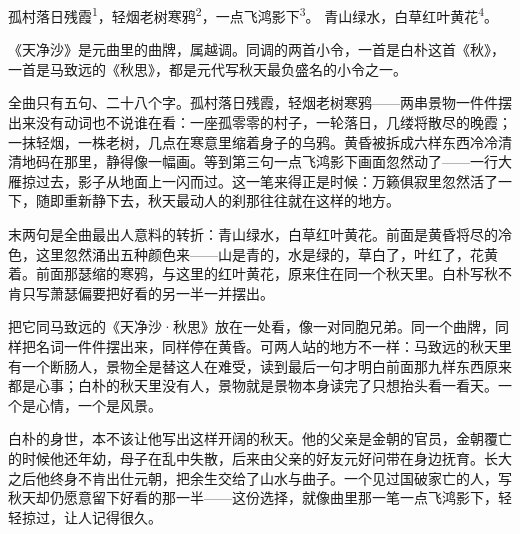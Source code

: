 
\begin{poem}
孤村落日残霞\textsuperscript{1}，轻烟老树寒鸦\textsuperscript{2}，一点飞鸿影下\textsuperscript{3}。
青山绿水，白草红叶黄花\textsuperscript{4}。
\end{poem}

\begin{annotations}
\end{annotations}

\begin{appreciation}
《天净沙》是元曲里的曲牌，属越调。同调的两首小令，一首是白朴这首《秋》，一首是马致远的《秋思》，都是元代写秋天最负盛名的小令之一。

全曲只有五句、二十八个字。孤村落日残霞，轻烟老树寒鸦——两串景物一件件摆出来没有动词也不说谁在看：一座孤零零的村子，一轮落日，几缕将散尽的晚霞；一抹轻烟，一株老树，几点在寒意里缩着身子的乌鸦。黄昏被拆成六样东西冷冷清清地码在那里，静得像一幅画。等到第三句一点飞鸿影下画面忽然动了——一行大雁掠过去，影子从地面上一闪而过。这一笔来得正是时候：万籁俱寂里忽然活了一下，随即重新静下去，秋天最动人的刹那往往就在这样的地方。

末两句是全曲最出人意料的转折：青山绿水，白草红叶黄花。前面是黄昏将尽的冷色，这里忽然涌出五种颜色来——山是青的，水是绿的，草白了，叶红了，花黄着。前面那瑟缩的寒鸦，与这里的红叶黄花，原来住在同一个秋天里。白朴写秋不肯只写萧瑟偏要把好看的另一半一并摆出。

把它同马致远的《天净沙·秋思》放在一处看，像一对同胞兄弟。同一个曲牌，同样把名词一件件摆出来，同样停在黄昏。可两人站的地方不一样：马致远的秋天里有一个断肠人，景物全是替这人在难受，读到最后一句才明白前面那九样东西原来都是心事；白朴的秋天里没有人，景物就是景物本身读完了只想抬头看一看天。一个是心情，一个是风景。

白朴的身世，本不该让他写出这样开阔的秋天。他的父亲是金朝的官员，金朝覆亡的时候他还年幼，母子在乱中失散，后来由父亲的好友元好问带在身边抚育。长大之后他终身不肯出仕元朝，把余生交给了山水与曲子。一个见过国破家亡的人，写秋天却仍愿意留下好看的那一半——这份选择，就像曲里那一笔一点飞鸿影下，轻轻掠过，让人记得很久。
\end{appreciation}
